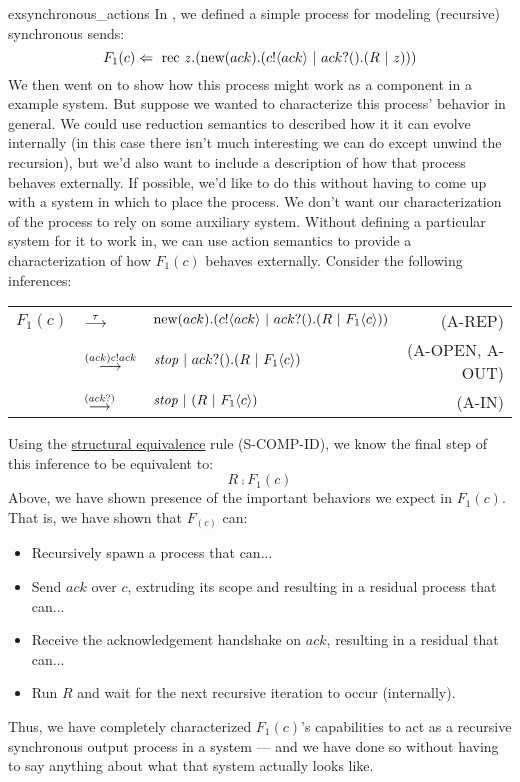 \begin{example}{exsynchronous_actions}
	In , we defined a simple process for modeling (recursive) synchronous sends:
\[
	F_1(c) \Leftarrow\  \text{rec }{z}. (\text{new}({ack}).({c}!\langle{ack}\rangle \ |\  {ack}?({}).(R \ |\  z)))\\
\]
We then went on to show how this process might work as a component in a example system.  
But suppose we wanted to characterize this process' behavior in general.  
We could use reduction semantics to described how it it can evolve internally (in this case there isn't much interesting we can do except unwind the recursion), but we'd also want to include a description of how that process behaves externally.  
If possible, we'd like to do this without having to come up with a system in which to place the process.  
We don't want our characterization of the process to rely on some auxiliary system.  
Without defining a particular system for it to work in, we can use action semantics to provide a characterization of how $F_1(c)$ behaves externally.  
Consider the following inferences:
\begin{center}\begin{tabular}{lllr}
	$F_1(c)$ & $\overset{{\tau}}{\longrightarrow}$ & $\text{new}({ack}).({c}!\langle{ack}\rangle \ |\  {ack}?({}).(R \ |\  F_1\langle c\rangle))$ & \tiny{(A-REP)}\\
	& $\overset{{({ack}){c}!{ack}}}{\longrightarrow}$ & $\mbox{\emph{stop}} \ |\  {ack}?({}).(R \ |\  F_1\langle c\rangle)$ & \tiny{(A-OPEN, A-OUT)}\\
	& $\overset{{({{ack}?{}})}}{\longrightarrow}$ & $\mbox{\emph{stop}} \ |\  (R \ |\  F_1\langle c\rangle)$& \tiny{(A-IN)}\\
\end{tabular}\end{center}
Using the \hyperref[Structural Equivalence]{structural equivalence} rule (S-COMP-ID),  
we know the final step of this inference to be equivalent to:
\[
	R \comp F_1(c)
\]
Above, we have shown presence of the important behaviors we expect in $F_1(c)$.  
That is, we have shown that $F_(c)$ can:
\begin{itemize}
\item Recursively spawn a process that can...
\item Send $ack$ over $c$, extruding its scope and resulting in a residual process that can...
\item Receive the acknowledgement handshake on $ack$, resulting in a residual that can... 
\item Run $R$ and wait for the next recursive iteration to occur (internally).
\end{itemize}
Thus, we have completely characterized $F_1(c)$'s capabilities to act as a recursive synchronous output process in a system --- and we have done so without having to say anything about what that system actually looks like. 
\end{example}

